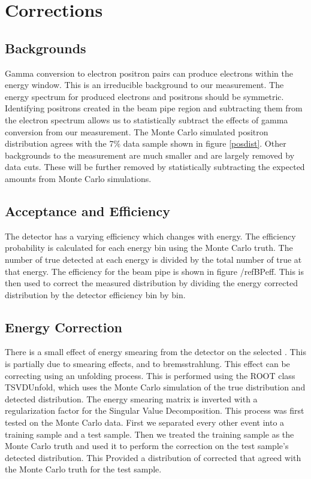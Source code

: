 \section{\deltaray Corrections}
\label{sec:corr}
\subsection{Backgrounds}
	Gamma conversion to electron positron pairs can produce electrons within the energy window. This is an irreducible background to our measurement. The energy spectrum for produced electrons and positrons should be symmetric. Identifying positrons created in the beam pipe region and subtracting them from the electron spectrum allows us to statistically subtract the effects of gamma conversion from our measurement. The Monte Carlo simulated positron distribution agrees with the 7\% data sample shown in figure \ref{posdist}.
	Other backgrounds to the measurement are much smaller and are largely removed by data cuts. These will be further removed by statistically subtracting the expected amounts from Monte Carlo simulations.

\subsection{Acceptance and Efficiency}
	The \babar detector has a varying efficiency which changes with energy. The efficiency probability is calculated for each energy bin using the Monte Carlo truth. The number of true detected \deltarays at each energy is divided by the total number of true \deltarays at that energy. The efficiency for the beam pipe is shown in figure /ref{BPeff}. This is then used to correct the measured distribution by dividing the energy corrected \deltaray distribution by the detector efficiency bin by bin. 
\subsection{Energy Correction}
	There is a small effect of energy smearing from the detector on the selected \deltarays. This is partially due to smearing effects, and to bremsstrahlung. This effect can be correcting using an unfolding process. This is performed using the ROOT class TSVDUnfold, which uses the Monte Carlo simulation of the true distribution and detected distribution. The energy smearing matrix is inverted with a regularization factor for the Singular Value Decomposition. 
	This process was first tested on the Monte Carlo data. First we separated every other event into a training sample and a test sample. Then we treated the training sample as the Monte Carlo truth and used it to perform the correction on the test sample’s detected distribution. This Provided a distribution of corrected \deltarays that agreed with the Monte Carlo truth for the test sample.

